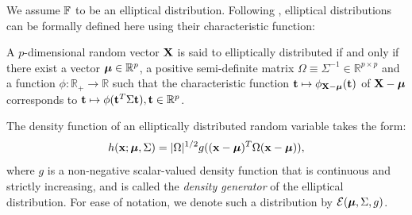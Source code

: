 We assume ${\mathbb{F}}$ to be an elliptical distribution. Following \cite{FangEtal90}, elliptical distributions can be formally defined here using their characteristic function:
%
\begin{Definition}
A $p$-dimensional random vector ${\mathbf{X}}$ is said to elliptically distributed if and only if there exist a vector ${\boldsymbol{\mu}} \in \mathbb R^p$, a positive semi-definite matrix $\Omega \equiv \Sigma^{-1} \in \mathbb R^{p \times p}$ and a function $\phi: \mathbb R_+ \rightarrow \mathbb R$ such that the characteristic function ${\bf{t}} \mapsto \phi_{{\mathbf{X}} - {\boldsymbol{\mu}}} ({\bf{t}})$ of ${\mathbf{X}} - {\boldsymbol{\mu}}$ corresponds to ${\bf{t}} \mapsto \phi ({\bf{t}}^T \Sigma {\bf{t}}), {\bf{t}} \in \mathbb R^p$.
\end{Definition}
%
\noindent The density function of an elliptically distributed random variable takes the form:
%
$$
h({\bf{x}}; {\boldsymbol{\mu}}, \Sigma) = |\Omega|^{1/2} g (({\bf{x}} - {\boldsymbol{\mu}})^T \Omega ({\bf{x}} - {\boldsymbol{\mu}})),
$$
%
where $g$ is a non-negative scalar-valued density function that is continuous and strictly increasing, and is called the \textit{density generator} of the elliptical distribution. For ease of notation, we denote such a distribution by $\mathcal{E} ({\boldsymbol{\mu}}, \Sigma, g)$.


%
%

